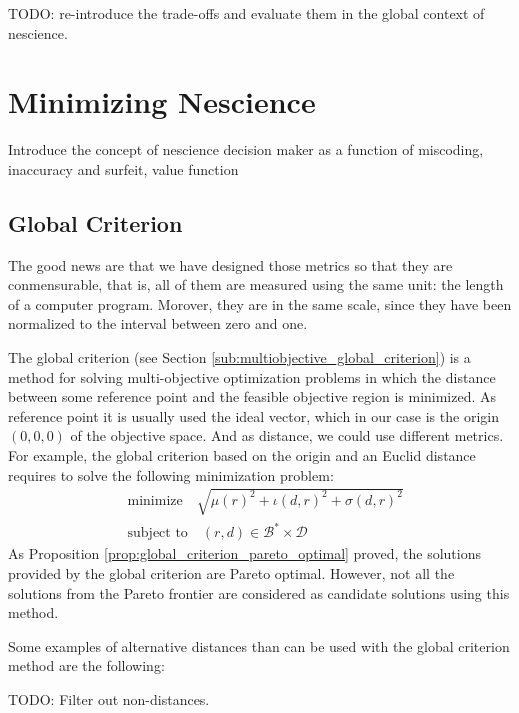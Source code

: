 {\color{red} TODO: re-introduce the trade-offs and evaluate them in the global context of nescience.}

%
%

\section{Minimizing Nescience}

{\color{red} Introduce the concept of nescience decision maker as a function of miscoding, inaccuracy and surfeit, value function}


\subsection{Global Criterion}

{\color{red} The good news are that we have designed those metrics so that they are conmensurable, that is, all of them are measured using the same unit: the length of a computer program. Morover, they are in the same scale, since they have been normalized to the interval between zero and one.}

The global criterion (see Section \ref{sub:multiobjective_global_criterion}) is a method for solving multi-objective optimization problems in which the distance between some reference point and the feasible objective region is minimized. As reference point it is usually used the ideal vector, which in our case is the origin $(0, 0, 0)$ of the objective space. And as distance, we could use different metrics. For example, the global criterion based on the origin and an Euclid distance requires to solve the following minimization problem:
\begin{align*}
    & \text{minimize} \quad \sqrt{ \mu(r)^2 + \iota(d, r)^2 + \sigma(d, r)^2 } \\
    & \text{subject to} \quad (r, d) \in \mathcal{B}^\ast \times \mathcal{D}
\end{align*}
As Proposition \ref{prop:global_criterion_pareto_optimal} proved, the solutions provided by the global criterion are Pareto optimal. However, not all the solutions from the Pareto frontier are considered as candidate solutions using this method.

Some examples of alternative distances than can be used with the global criterion method are the following:

{\color{red} TODO: Filter out non-distances.}


